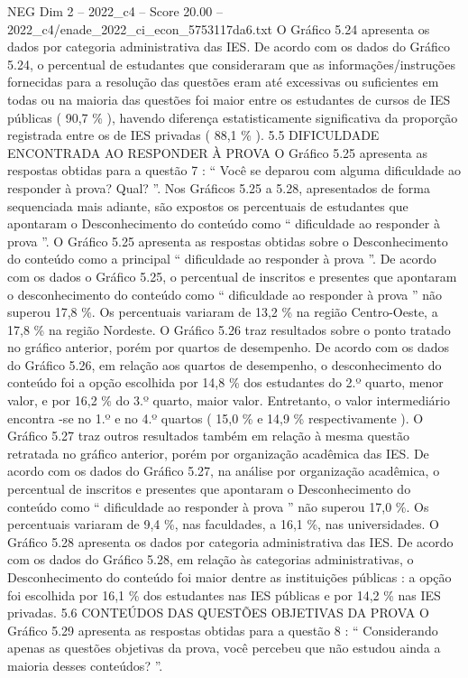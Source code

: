 \begin{textsample}{NEG Dim 2 – 2022\_c4 – Score 20.00 – 2022\_c4/enade\_2022\_ci\_econ\_5753117da6.txt}
O Gráfico 5.24 apresenta os dados por categoria administrativa das IES.
De acordo com os dados do Gráfico 5.24, o percentual de estudantes que consideraram que as informações/instruções fornecidas para a resolução das questões eram até excessivas ou suficientes em todas ou na maioria das questões foi maior entre os estudantes de cursos de IES públicas ( 90,7 \% ), havendo diferença estatisticamente significativa da proporção registrada entre os de IES privadas ( 88,1 \% ). 5.5 DIFICULDADE ENCONTRADA AO RESPONDER À PROVA O Gráfico 5.25 apresenta as respostas obtidas para a questão 7 : “ Você se deparou com alguma dificuldade ao responder à prova?
Qual? ”.
Nos Gráficos 5.25 a 5.28, apresentados de forma sequenciada mais adiante, são expostos os percentuais de estudantes que apontaram o Desconhecimento do conteúdo como “ dificuldade ao responder à prova ”.
O Gráfico 5.25 apresenta as respostas obtidas sobre o Desconhecimento do conteúdo como a principal “ dificuldade ao responder à prova ”.
De acordo com os dados o Gráfico 5.25, o percentual de inscritos e presentes que apontaram o desconhecimento do conteúdo como “ dificuldade ao responder à prova ” não superou 17,8 \%.
Os percentuais variaram de 13,2 \% na região Centro-Oeste, a 17,8 \% na região Nordeste.
O Gráfico 5.26 traz resultados sobre o ponto tratado no gráfico anterior, porém por quartos de desempenho.
De acordo com os dados do Gráfico 5.26, em relação aos quartos de desempenho, o desconhecimento do conteúdo foi a opção escolhida por 14,8 \% dos estudantes do 2.º quarto, menor valor, e por 16,2 \% do 3.º quarto, maior valor.
Entretanto, o valor intermediário encontra -se no 1.º e no 4.º quartos ( 15,0 \% e 14,9 \% respectivamente ).
O Gráfico 5.27 traz outros resultados também em relação à mesma questão retratada no gráfico anterior, porém por organização acadêmica das IES.
De acordo com os dados do Gráfico 5.27, na análise por organização acadêmica, o percentual de inscritos e presentes que apontaram o Desconhecimento do conteúdo como “ dificuldade ao responder à prova ” não superou 17,0 \%.
Os percentuais variaram de 9,4 \%, nas faculdades, a 16,1 \%, nas universidades.
O Gráfico 5.28 apresenta os dados por categoria administrativa das IES.
De acordo com os dados do Gráfico 5.28, em relação às categorias administrativas, o Desconhecimento do conteúdo foi maior dentre as instituições públicas : a opção foi escolhida por 16,1 \% dos estudantes nas IES públicas e por 14,2 \% nas IES privadas. 5.6 CONTEÚDOS DAS QUESTÕES OBJETIVAS DA PROVA O Gráfico 5.29 apresenta as respostas obtidas para a questão 8 : “ Considerando apenas as questões objetivas da prova, você percebeu que não estudou ainda a maioria desses conteúdos? ”.

\end{textsample}
